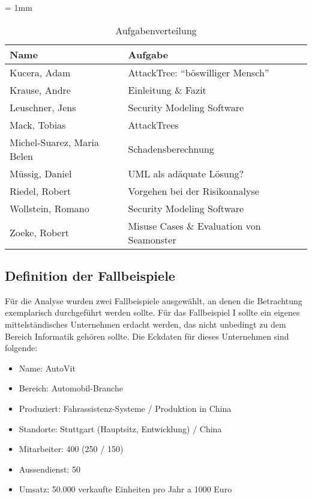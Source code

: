 \begin{table}[H]
	\sffamily
	\caption{Aufgabenverteilung}
	\tabulinesep = 1mm %
	\centering
		\begin{tabu} to 0.9\textwidth { X[1.5]  X[3] }
		\hline
		\textbf{Name} & \textbf{Aufgabe}\\
		\hline 
		Kucera, Adam & AttackTree: "`böswilliger Mensch"'\\

		Krause, Andre & Einleitung \& Fazit\\

		Leuschner, Jens & Security Modeling Software\\

		Mack, Tobias & AttackTrees\\

		Michel-Suarez, Maria Belen & Schadensberechnung\\

		Müssig, Daniel & UML als adäquate Lösung?\\

		Riedel, Robert & Vorgehen bei der Risikoanalyse\\

		Wollstein, Romano & Security Modeling Software\\

		Zoeke, Robert & Misuse Cases \& Evaluation von Seamonster\\

	\end{tabu}
\end{table}

\subsection{Definition der Fallbeispiele}
Für die Analyse wurden zwei Fallbeispiele ausgewählt, an denen die Betrachtung exemplarisch durchgeführt werden sollte. Für das Fallbeispiel I sollte ein eigenes mittelständisches Unternehmen erdacht werden, das nicht unbedingt zu dem Bereich Informatik gehören sollte. Die Eckdaten für dieses Unternehmen sind folgende:

\begin{itemize}
\item Name: AutoVit
\item Bereich: Automobil-Branche
\item Produziert: Fahrassistenz-Systeme / Produktion in China
\item Standorte: Stuttgart (Hauptsitz, Entwicklung) / China
\item Mitarbeiter: 400 (250 / 150)
\item Aussendienst: 50
\item Umsatz: 50.000 verkaufte Einheiten pro Jahr a 1000 Euro
\end{itemize}

